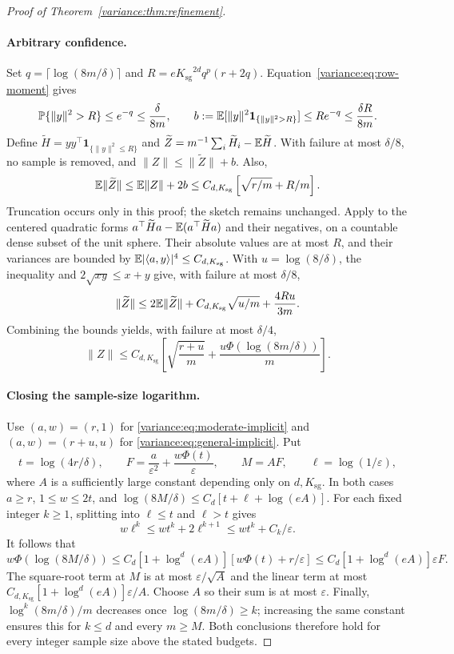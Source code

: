\documentclass[11pt,a4paper]{article}
\theoremstyle{definition}\newtheorem{definition}[theorem]{Definition}
\theoremstyle{remark}\newtheorem{remark}[theorem]{Remark}
\numberwithin{equation}{section}
\newcommand{\Ksg}{{K_{\mathrm{sg}}}}\newcommand{\Cfour}{{C_4}}
\newcommand{\norm}[1]{\lVert#1\rVert}\newcommand{\ip}[2]{\langle#1,#2\rangle}
\begin{document}
\begin{proof}[Proof of Theorem~\ref{variance:thm:refinement}]
\paragraph{Arbitrary confidence.}
Set $q=\lceil\log(8m/\delta)\rceil$ and
$R=e\Ksg^{2d}q^p(r+2q)$. Equation~\eqref{variance:eq:row-moment} gives
\[
 \Pp\{\norm y^2>R\}\le e^{-q}\le\frac\delta{8m},\qquad
 b:=\E[\norm y^2\mathbf1_{\{\norm y^2>R\}}]\le Re^{-q}
                                                    \le\frac{\delta R}{8m}.
\]
Define $\widetilde H=yy^\top\mathbf1_{\{\norm y^2\le R\}}$ and
$\widetilde Z=m^{-1}\sum_i\widetilde H_i-\mathbb E\widetilde H$.
With failure at most $\delta/8$, no sample is removed, and
$\norm Z\le\norm{\widetilde Z}+b$. Also,
\[
 \E\norm{\widetilde Z}\le\E\norm Z+2b
             \le C_{d,\Ksg}\left[\sqrt{r/m}+R/m\right].
\]
Truncation occurs only in this proof; the sketch remains unchanged.
Apply \cite[Theorem~2.3]{Bousquet2002} to the centered quadratic forms
$a^\top\widetilde Ha-\mathbb E(a^\top\widetilde Ha)$ and their negatives,
on a countable dense subset of the unit sphere. Their absolute values
are at most $R$, and their variances are bounded by
$\E|\ip ay|^4\le C_{d,\Ksg}$. With $u=\log(8/\delta)$, the inequality
and $2\sqrt{xy}\le x+y$ give, with failure at most $\delta/8$,
\[
 \norm{\widetilde Z}\le2\E\norm{\widetilde Z}
             +C_{d,\Ksg}\sqrt{u/m}+\frac{4Ru}{3m}.
\]
Combining the bounds yields, with failure at most $\delta/4$,
\begin{equation}\label{variance:eq:general-implicit}
 \norm Z\le C_{d,\Ksg}\left[\sqrt{\frac{r+u}{m}}
                   +\frac{u\Phi(\log(8m/\delta))}{m}\right].
\end{equation}

\paragraph{Closing the sample-size logarithm.}
Use $(a,w)=(r,1)$ for \eqref{variance:eq:moderate-implicit} and
$(a,w)=(r+u,u)$ for \eqref{variance:eq:general-implicit}. Put
\[
 t=\log(4r/\delta),\qquad F=\frac a{\varepsilon^2}
       +\frac{w\Phi(t)}{\varepsilon},\qquad M=AF,
       \qquad\ell=\log(1/\varepsilon),
\]
where $A$ is a sufficiently large constant depending only on $d,\Ksg$.
In both cases $a\ge r$, $1\le w\le2t$, and
$\log(8M/\delta)\le C_d[t+\ell+\log(eA)]$.
For each fixed integer $k\ge1$, splitting into $\ell\le t$ and $\ell>t$ gives
\[
 w\ell^k\le wt^k+2\ell^{k+1}\le wt^k+C_k/\varepsilon.
\]
It follows that
\[
 w\Phi(\log(8M/\delta))\le C_d[1+\log^d(eA)]
       \left[w\Phi(t)+r/\varepsilon\right]
       \le C_d[1+\log^d(eA)]\varepsilon F.
\]
The square-root term at $M$ is at most $\varepsilon/\sqrt A$ and the
linear term at most $C_{d,\Ksg}[1+\log^d(eA)]\varepsilon/A$.
Choose $A$ so their sum is at most $\varepsilon$.
Finally, $\log^k(8m/\delta)/m$ decreases once $\log(8m/\delta)\ge k$;
increasing the same constant ensures this for $k\le d$ and every $m\ge M$.
Both conclusions therefore hold for every integer sample size above the stated budgets.
\end{proof}
\end{document}
